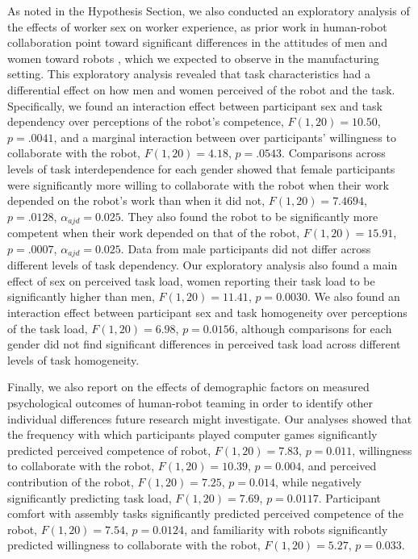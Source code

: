 As noted in the Hypothesis Section, we also conducted an exploratory analysis of the effects of worker sex on worker experience, as prior work in human-robot collaboration point toward significant differences in the attitudes of men and women toward robots \cite{mutlu2006task,mutlu2006storytelling,schermerhorn2008robot,takayama2009influences}, which we expected to observe in the manufacturing setting. This exploratory analysis revealed that task characteristics had a differential effect on how men and women perceived of the robot and the task. Specifically, we found an interaction effect between participant sex and task dependency over perceptions of the robot's competence, $F(1,20)=10.50$, $p=.0041$, and a marginal interaction between over participants' willingness to collaborate with the robot, $F(1,20)=4.18$, $p=.0543$. Comparisons across levels of task interdependence for each gender showed that female participants were significantly more willing to collaborate with the robot when their work depended on the robot's work than when it did not, $F(1,20) = 7.4694$, $p = .0128$, $\alpha_{ajd}=0.025$.
They also found the robot to be significantly more competent when their work depended on that of the robot, $F(1,20) = 15.91$, $p = .0007$, $\alpha_{ajd}=0.025$.
Data from male participants did not differ across different levels of task dependency.
Our exploratory analysis also found a main effect of sex on perceived task load, women reporting their task load to be significantly higher than men, $F(1,20) = 11.41$, $p = 0.0030$. We also found an interaction effect between participant sex and task homogeneity over perceptions of the task load, $F(1,20) = 6.98$, $p = 0.0156$, although comparisons for each gender did not find significant differences in perceived task load across different levels of task homogeneity.

Finally, we also report on the effects of demographic factors on measured psychological outcomes of human-robot teaming in order to identify other individual differences future research might investigate. Our analyses showed that the frequency with which participants played computer games significantly predicted perceived competence of robot, $F(1,20) = 7.83$, $p = 0.011$, willingness to collaborate with the robot, $F(1,20) = 10.39$, $p = 0.004$, and perceived contribution of the robot, $F(1,20) = 7.25$, $p = 0.014$, while negatively significantly predicting task load, $F(1,20) = 7.69$, $p = 0.0117$. Participant comfort with assembly tasks significantly predicted perceived competence of the robot, $F(1,20) = 7.54$, $p = 0.0124$, and familiarity with robots significantly predicted willingness to collaborate with the robot, $F(1,20) = 5.27$, $p = 0.033$.

